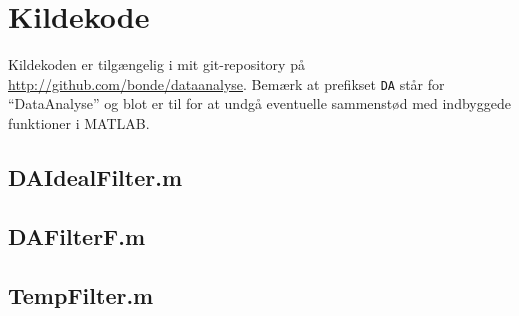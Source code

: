 \documentclass[a4paper, 10pt, danish, final]{article}
\def\repository{\url{http://github.com/bonde/dataanalyse}}
\begin{document}
\appendix
\lstset{language=Matlab, basicstyle=\scriptsize,
    showstringspaces=false, numbers=left, stepnumber=1,
    numberstyle=\tiny, frame=none}
\section{Kildekode}
Kildekoden er tilgængelig i mit git-repository på \repository{}. Bemærk
at prefikset \texttt{DA} står for ``DataAnalyse'' og blot er til for at
undgå eventuelle sammenstød med indbyggede funktioner i MATLAB.

\subsection{DAIdealFilter.m}


\subsection{DAFilterF.m}


\subsection{TempFilter.m}

\end{document}
